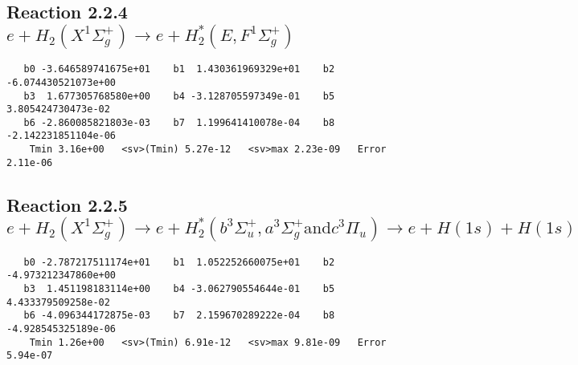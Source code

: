 \documentclass[12pt]{article}
\begin{document}
                             


\newpage
\subsection{
Reaction 2.2.4 $e + H_2(X^1\Sigma_g^+) \rightarrow e + H_2^*(E,F^1\Sigma_g^+)$}














\begin{small}\begin{verbatim}
   b0 -3.646589741675e+01    b1  1.430361969329e+01    b2 -6.074430521073e+00
   b3  1.677305768580e+00    b4 -3.128705597349e-01    b5  3.805424730473e-02
   b6 -2.860085821803e-03    b7  1.199641410078e-04    b8 -2.142231851104e-06
    Tmin 3.16e+00   <sv>(Tmin) 5.27e-12   <sv>max 2.23e-09   Error 2.11e-06
\end{verbatim}\end{small}

\newpage
\subsection{
Reaction 2.2.5 $e +H_2(X^1\Sigma_g^+) \rightarrow 
e + H_2^*(b^3\Sigma_u^+, a^3\Sigma_g^+ \mbox{and} c^3\Pi_u) \rightarrow
e + H(1s) + H(1s)$}






%
%





\begin{small}\begin{verbatim}
   b0 -2.787217511174e+01    b1  1.052252660075e+01    b2 -4.973212347860e+00
   b3  1.451198183114e+00    b4 -3.062790554644e-01    b5  4.433379509258e-02
   b6 -4.096344172875e-03    b7  2.159670289222e-04    b8 -4.928545325189e-06
    Tmin 1.26e+00   <sv>(Tmin) 6.91e-12   <sv>max 9.81e-09   Error 5.94e-07
\end{verbatim}\end{small}
\end{document}
